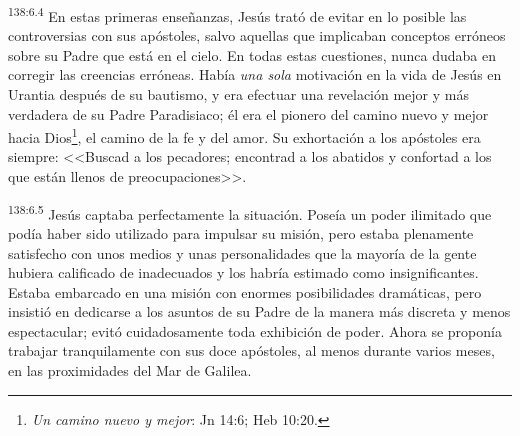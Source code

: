 \par 
\textsuperscript{138:6.4} En estas primeras enseñanzas, Jesús trató de evitar en lo posible las controversias con sus apóstoles, salvo aquellas que implicaban conceptos erróneos sobre su Padre que está en el cielo. En todas estas cuestiones, nunca dudaba en corregir las creencias erróneas. Había \textit{una sola} motivación en la vida de Jesús en Urantia después de su bautismo, y era efectuar una revelación mejor y más verdadera de su Padre Paradisiaco; él era el pionero del camino nuevo y mejor hacia Dios\footnote{\textit{Un camino nuevo y mejor}: Jn 14:6; Heb 10:20.}, el camino de la fe y del amor. Su exhortación a los apóstoles era siempre: <<Buscad a los pecadores; encontrad a los abatidos y confortad a los que están llenos de preocupaciones>>.

\par 
\textsuperscript{138:6.5} Jesús captaba perfectamente la situación. Poseía un poder ilimitado que podía haber sido utilizado para impulsar su misión, pero estaba plenamente satisfecho con unos medios y unas personalidades que la mayoría de la gente hubiera calificado de inadecuados y los habría estimado como insignificantes. Estaba embarcado en una misión con enormes posibilidades dramáticas, pero insistió en dedicarse a los asuntos de su Padre de la manera más discreta y menos espectacular; evitó cuidadosamente toda exhibición de poder. Ahora se proponía trabajar tranquilamente con sus doce apóstoles, al menos durante varios meses, en las proximidades del Mar de Galilea.

